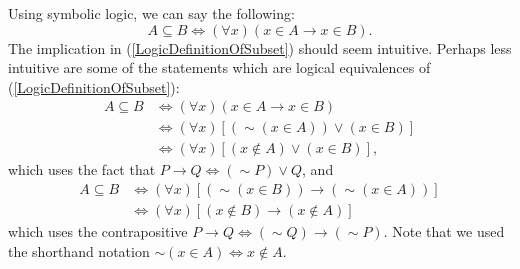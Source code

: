 Using symbolic logic, we can say the following:
\begin{equation}
A\subseteq B\iff (\forall x)(x\in A\longrightarrow x\in B).
\label{LogicDefinitionOfSubset}\end{equation}
  The implication in
(\ref{LogicDefinitionOfSubset}) should seem intuitive.
Perhaps less intuitive are some of the statements which are
logical equivalences of (\ref{LogicDefinitionOfSubset}):
\begin{align*}
A\subseteq B&\iff (\forall x)(x\in A\longrightarrow x\in B)\\
&\iff(\forall x)\left[(\sim(x\in A))\vee(x\in B)\right]\\
&\iff(\forall x)\left[(x\notin A)\vee(x\in B)\right],
\end{align*}
which uses the fact that $P\longrightarrow Q\iff(\sim P)\vee Q$, and
\begin{align*}
A\subseteq B&\iff(\forall x)\left[(\sim(x\in B))\longrightarrow(\sim(x\in A))
               \right]\\
& \iff(\forall x)\left[(x\notin B)\longrightarrow(x\notin A)\right]
\end{align*}
which uses the contrapositive $P\longrightarrow Q\iff
(\sim Q)\longrightarrow(\sim P)$.
Note that we used the shorthand notation
$\sim(x\in A)\iff x\notin A$.

